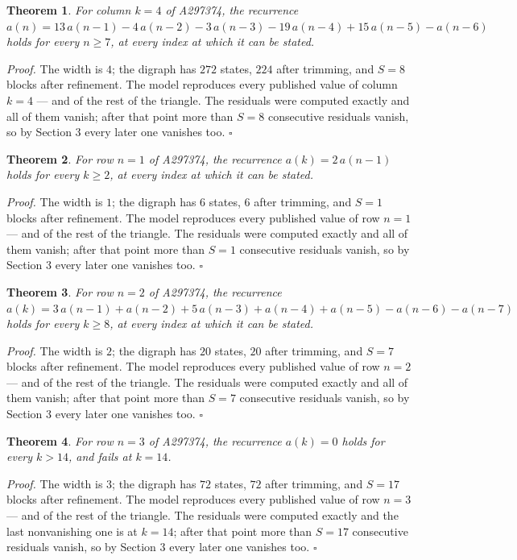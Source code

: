 \documentclass[11pt]{article}
\newtheorem{theorem}{Theorem}
\theoremstyle{definition}
\begin{document}
\begin{theorem} For column $k = 4$ of A297374, the recurrence $a(n) = 13\,a(n-1) - 4\,a(n-2) - 3\,a(n-3) - 19\,a(n-4) + 15\,a(n-5) - a(n-6)$ holds for every $n \ge 7$, at every index at which it can be stated.\end{theorem}

{\itshape Proof.} The width is $4$; the digraph has $272$ states, $224$ after trimming, and $S = 8$ blocks after refinement. The model reproduces every published value of column $k = 4$ --- and of the rest of the triangle. The residuals were computed exactly and all of them vanish; after that point more than $S = 8$ consecutive residuals vanish, so by Section 3 every later one vanishes too. $\square$

\begin{theorem} For row $n = 1$ of A297374, the recurrence $a(k) = 2\,a(n-1)$ holds for every $k \ge 2$, at every index at which it can be stated.\end{theorem}

{\itshape Proof.} The width is $1$; the digraph has $6$ states, $6$ after trimming, and $S = 1$ blocks after refinement. The model reproduces every published value of row $n = 1$ --- and of the rest of the triangle. The residuals were computed exactly and all of them vanish; after that point more than $S = 1$ consecutive residuals vanish, so by Section 3 every later one vanishes too. $\square$

\begin{theorem} For row $n = 2$ of A297374, the recurrence $a(k) = 3\,a(n-1) + a(n-2) + 5\,a(n-3) + a(n-4) + a(n-5) - a(n-6) - a(n-7)$ holds for every $k \ge 8$, at every index at which it can be stated.\end{theorem}

{\itshape Proof.} The width is $2$; the digraph has $20$ states, $20$ after trimming, and $S = 7$ blocks after refinement. The model reproduces every published value of row $n = 2$ --- and of the rest of the triangle. The residuals were computed exactly and all of them vanish; after that point more than $S = 7$ consecutive residuals vanish, so by Section 3 every later one vanishes too. $\square$

\begin{theorem} For row $n = 3$ of A297374, the recurrence $a(k) = 0$ holds for every $k > 14$, and fails at $k = 14$.\end{theorem}

{\itshape Proof.} The width is $3$; the digraph has $72$ states, $72$ after trimming, and $S = 17$ blocks after refinement. The model reproduces every published value of row $n = 3$ --- and of the rest of the triangle. The residuals were computed exactly and the last nonvanishing one is at $k = 14$; after that point more than $S = 17$ consecutive residuals vanish, so by Section 3 every later one vanishes too. $\square$
\end{document}
